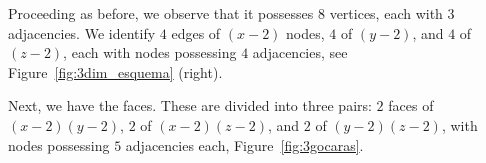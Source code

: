 Proceeding as before, we observe that it possesses $8$ vertices, each with $3$ adjacencies. We identify $4$ edges of \((x-2)\) nodes, $4$ of \((y-2)\), and $4$ of \((z-2)\), each with nodes possessing $4$ adjacencies, see Figure~\ref{fig:3dim_esquema} (right).


Next, we have the faces. These are divided into three pairs: $2$ faces of \((x-2)(y-2)\), $2$ of \((x-2)(z-2)\), and $2$ of \((y-2)(z-2)\), with nodes possessing $5$ adjacencies each, Figure~\ref{fig:3gocaras}.

